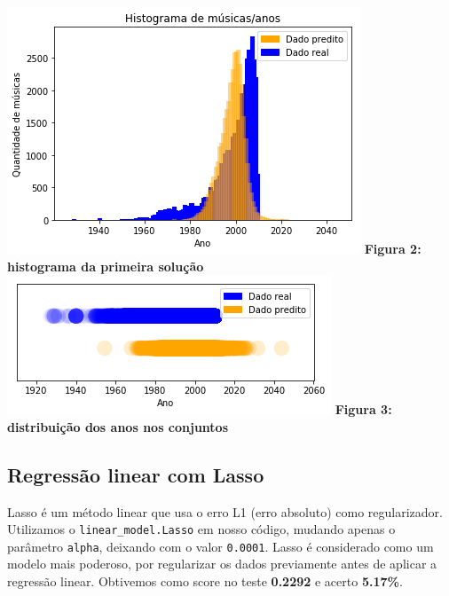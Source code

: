 \documentclass[conference]{IEEEtran}
\begin{document}
\begin{center}
\includegraphics[scale=0.6]{plot1}
\textbf{Figura 2: histograma da primeira solução}
\\
\includegraphics[scale=0.6]{plot2}
\textbf{Figura 3: distribuição dos anos nos conjuntos}

\end{center}


\subsection{Regressão linear com Lasso}
Lasso \cite{b5} é um método linear que usa o erro L1 (erro absoluto) como regularizador. Utilizamos o \texttt{linear\_model.Lasso} em nosso código, mudando apenas o parâmetro \texttt{alpha}, deixando com o valor \texttt{0.0001}. Lasso é considerado como um modelo mais poderoso, por regularizar os dados previamente antes de aplicar a regressão linear. Obtivemos como score no teste \textbf{0.2292} e acerto \textbf{5.17\%}.
\end{document}

